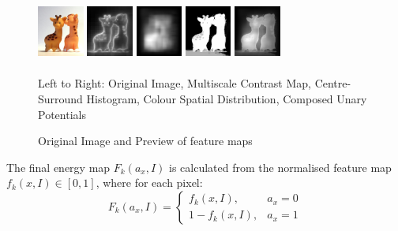 \documentclass[10pt,twocolumn,letterpaper]{article}
\begin{document}
\begin{figure}[b]
    \begin{center} %
    \includegraphics[width=0.6in,height=0.8in]{./Figures/previews/raw.jpg}
    \includegraphics[width=0.6in,height=0.8in]{./Figures/previews/MC.jpg}
    \includegraphics[width=0.6in,height=0.8in]{./Figures/previews/CSH.jpg} 
    \includegraphics[width=0.6in,height=0.8in]{./Figures/previews/CSD.jpg} 
    \includegraphics[width=0.6in,height=0.8in]{./Figures/previews/Composed.jpg} \\
    \caption{Original Image and Preview of feature maps}\vspace{1mm}
       \small Left to Right: Original Image, Multiscale Contrast Map, Centre-Surround Histogram, Colour Spatial Distribution, Composed Unary Potentials
\end{center}
\end{figure}

The final energy map $F_k(a_x,I)$ is calculated from the normalised feature map $f_k(x,I)\in[0,1]$, where for each pixel: $$F_k(a_x,I) = \left\{\begin{matrix}f_k(x,I), & a_x=0\\1-f_k(x,I), & a_x=1\end{matrix}\right.$$
\end{document}
